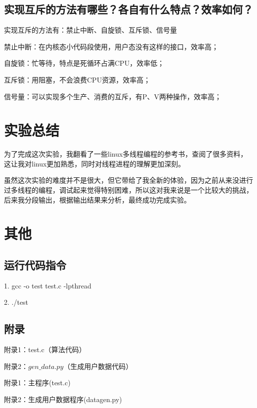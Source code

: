 \documentclass[UTF8]{ctexart}
\begin{document}
\subsection{实现互斥的方法有哪些？各自有什么特点？效率如何？}
实现互斥的方法有：禁止中断、自旋锁、互斥锁、信号量\par
禁止中断：在内核态小代码段使用，用户态没有这样的接口，效率高；\par
自旋锁：忙等待，特点是死循环占满CPU，效率低；\par
互斥锁：用阻塞，不会浪费CPU资源，效率高；\par
信号量：可以实现多个生产、消费的互斥，有P、V两种操作，效率高；\par

\section{实验总结}
为了完成这次实验，我翻看了一些linux多线程编程的参考书，查阅了很多资料，这让我对linux更加熟悉，同时对线程进程的理解更加深刻。\par
虽然这次实验的难度并不是很大，但它带给了我全新的体验，因为之前从来没进行过多线程的编程，调试起来觉得特别困难，所以这对我来说是一个比较大的挑战，后来我分段输出，根据输出结果来分析，最终成功完成实验。

\section{其他}
\subsection{运行代码指令}
1. gcc -o test test.c -lpthread\par
2. ./test
\subsection{附录}
附录1：test.c（算法代码）\par
附录2：$gen\_ data.py$（生成用户数据代码）\par

\newpage
附录1：主程序(test.c)\par


\newpage
附录2：生成用户数据程序(datagen.py)\par

\end{document}
